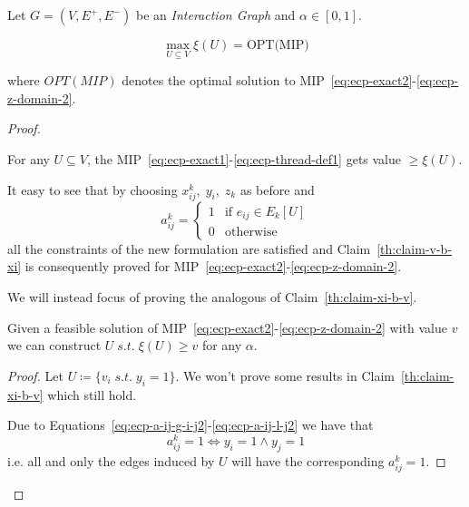 \begin{theorem}
	\label{th:ecp-mip}
	Let $G = (V, E^{+}, E^{-})$ be an \emph{Interaction Graph} and $\alpha \in
		[0, 1]$.

	\begin{equation}
		\max_{U \subseteq V} \xi(U) = \text{OPT(MIP)}
	\end{equation}

	where $OPT(MIP)$ denotes the optimal solution to
	MIP~\ref{eq:ecp-exact2}-\ref{eq:ecp-z-domain-2}.
\end{theorem}
\begin{proof}
	\begin{claim}
		\label{th:claim-v-b-xi2}
		For any $U \subseteq V$, the
		MIP~\ref{eq:ecp-exact1}-\ref{eq:ecp-thread-def1} gets value $\geq \xi(U)$.
	\end{claim}

	It easy to see that by choosing $x_{ij}^{k}, \; y_i, \; z_k$ as before and
	\begin{equation*}
		a_{ij}^{k} = \begin{cases}
			1 & \text{if } e_{ij} \in E_k[U] \\
			0 & \text{otherwise}
		\end{cases}
	\end{equation*}
	all the constraints of the new formulation are satisfied and
	Claim~\ref{th:claim-v-b-xi} is consequently proved for
	MIP~\ref{eq:ecp-exact2}-\ref{eq:ecp-z-domain-2}.

	We will instead focus of proving the analogous of Claim~\ref{th:claim-xi-b-v}.
	\begin{claim}
		\label{th:claim-xi-b-v2}
		Given a feasible solution of
		MIP~\ref{eq:ecp-exact2}-\ref{eq:ecp-z-domain-2} with value $v$ we can
		construct $U \; s.t. \; \xi(U) \geq v$ for any $\alpha$.
	\end{claim}

	\begin{proof}
		Let $U \coloneqq \{ v_i \; s.t. \; y_i = 1\} $. We won't prove
		some results in Claim~\ref{th:claim-xi-b-v} which still hold.

		Due to Equations~\ref{eq:ecp-a-ij-g-i-j2}-\ref{eq:ecp-a-ij-l-j2} we
		have that
		\begin{equation}
			a_{ij}^{k} = 1 \iff y_i = 1 \land y_j = 1
		\end{equation}
		i.e. all and only the edges induced by $U$ will have the corresponding
		$a_{ij}^{k} = 1$.


\end{proof}
\end{proof}
